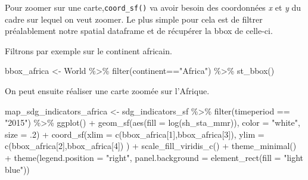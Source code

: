 \documentclass[
]{book}
\newenvironment{Shaded}{\begin{snugshade}}{\end{snugshade}}
\newcommand{\AttributeTok}[1]{\textcolor[rgb]{0.77,0.63,0.00}{#1}}
\newcommand{\DecValTok}[1]{\textcolor[rgb]{0.00,0.00,0.81}{#1}}
\newcommand{\FunctionTok}[1]{\textcolor[rgb]{0.00,0.00,0.00}{#1}}
\newcommand{\NormalTok}[1]{#1}
\newcommand{\OtherTok}[1]{\textcolor[rgb]{0.56,0.35,0.01}{#1}}
\newcommand{\SpecialCharTok}[1]{\textcolor[rgb]{0.00,0.00,0.00}{#1}}
\newcommand{\StringTok}[1]{\textcolor[rgb]{0.31,0.60,0.02}{#1}}
\begin{document}
Pour zoomer sur une carte,\texttt{coord\_sf()} va avoir besoin des coordonnées \emph{x} et \emph{y} du cadre sur lequel on veut zoomer.
Le plus simple pour cela est de filtrer préalablement
notre spatial dataframe et de récupérer la bbox de celle-ci.

Filtrons par exemple sur le continent africain.

\begin{Shaded}
\begin{Highlighting}[]
\NormalTok{bbox\_africa }\OtherTok{\textless{}{-}}\NormalTok{ World }\SpecialCharTok{\%\textgreater{}\%} 
  \FunctionTok{filter}\NormalTok{(continent}\SpecialCharTok{==}\StringTok{"Africa"}\NormalTok{) }\SpecialCharTok{\%\textgreater{}\%} 
  \FunctionTok{st\_bbox}\NormalTok{()}
\end{Highlighting}
\end{Shaded}

On peut ensuite réaliser une carte zoomée sur l'Afrique.

\begin{Shaded}
\begin{Highlighting}[]
\NormalTok{map\_sdg\_indicators\_africa }\OtherTok{\textless{}{-}}\NormalTok{ sdg\_indicators\_sf }\SpecialCharTok{\%\textgreater{}\%}
  \FunctionTok{filter}\NormalTok{(timeperiod }\SpecialCharTok{==} \StringTok{"2015"}\NormalTok{) }\SpecialCharTok{\%\textgreater{}\%}
  \FunctionTok{ggplot}\NormalTok{() }\SpecialCharTok{+}
  \FunctionTok{geom\_sf}\NormalTok{(}\FunctionTok{aes}\NormalTok{(}\AttributeTok{fill =} \FunctionTok{log}\NormalTok{(sh\_sta\_mmr)), }\AttributeTok{color =} \StringTok{"white"}\NormalTok{, }\AttributeTok{size =}\NormalTok{ .}\DecValTok{2}\NormalTok{) }\SpecialCharTok{+}
  \FunctionTok{coord\_sf}\NormalTok{(}\AttributeTok{xlim =} \FunctionTok{c}\NormalTok{(bbox\_africa[}\DecValTok{1}\NormalTok{],bbox\_africa[}\DecValTok{3}\NormalTok{]),}
           \AttributeTok{ylim =} \FunctionTok{c}\NormalTok{(bbox\_africa[}\DecValTok{2}\NormalTok{],bbox\_africa[}\DecValTok{4}\NormalTok{])}
\NormalTok{           ) }\SpecialCharTok{+}
  \FunctionTok{scale\_fill\_viridis\_c}\NormalTok{() }\SpecialCharTok{+}
  \FunctionTok{theme\_minimal}\NormalTok{() }\SpecialCharTok{+}
  \FunctionTok{theme}\NormalTok{(}\AttributeTok{legend.position =} \StringTok{"right"}\NormalTok{, }\AttributeTok{panel.background =} \FunctionTok{element\_rect}\NormalTok{(}\AttributeTok{fill =} \StringTok{"light blue"}\NormalTok{))}
\end{Highlighting}
\end{Shaded}
\end{document}
